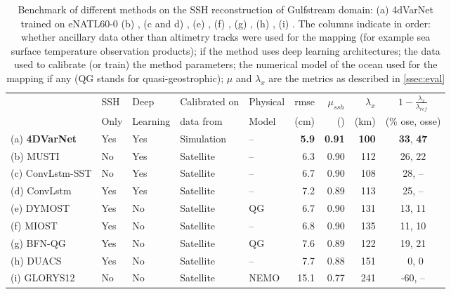 \documentclass[draft]{agujournal2019}
\begin{document}
\begin{table}[h]
\hspace{-10mm}\begin{tabular}{l||llll|rrrc}
\toprule
 & SSH  & Deep  & Calibrated on  & Physical  & rmse & $\mu_{ssh}$  & $\lambda_x$ & $1 - \frac{\lambda_x}{\lambda_{ref}}$ \\
 &  Only &  Learning &  data from &  Model &  (cm) &  () &  (km) & (\% ose, osse) \\
\midrule
(a) \textbf{4DVarNet} &  Yes & Yes & Simulation  & -- & \textbf{5.9}  & \textbf{0.91}  & \textbf{100} & \textbf{33}, \textbf{47} \\
(b) MUSTI & No &  Yes & Satellite  & -- & 6.3  & 0.90  & 112 & 26, 22 \\
(c) ConvLstm-SST & No &  Yes & Satellite  & -- & 6.7  & 0.90  & 108 & 28, -- \\
(d) ConvLstm &  Yes &  Yes & Satellite  & -- & 7.2  & 0.89  & 113 & 25, -- \\
(e) DYMOST&  Yes & No & Satellite  & QG & 6.7  & 0.90  & 131 & 13, 11 \\
(f) MIOST &  Yes & No & Satellite  & -- & 6.8  & 0.90  & 135 & 11, 10 \\
(g) BFN-QG &  Yes & No & Satellite  & QG & 7.6  & 0.89  & 122 & 19, 21 \\
(h) DUACS &  Yes & No & Satellite  & -- & 7.7  & 0.88  & 151 &  ~0,  0 \\
(i) GLORYS12 & No & No & Satellite  & NEMO & 15.1  & 0.77  & 241 & -60, -- \\
\bottomrule
\end{tabular}
\caption{ Benchmark of different methods on the SSH reconstruction of Gulfstream domain: (a) 4dVarNet trained on eNATL60-0 (b) , (c and d) , (e) , (f) , (g) , (h) , (i) . The columns indicate in order: whether ancillary data other than altimetry tracks were used for the mapping (for example sea surface temperature observation products); if the method uses deep learning architectures; the data used to calibrate (or train) the method parameters; the numerical model of the ocean used for the mapping if any (QG stands for quasi-geostrophic); $\mu$ and $\lambda_x$ are the metrics as described in \ref{ssec:eval}}
\label{tab:bench}
\end{table}
\end{document}
